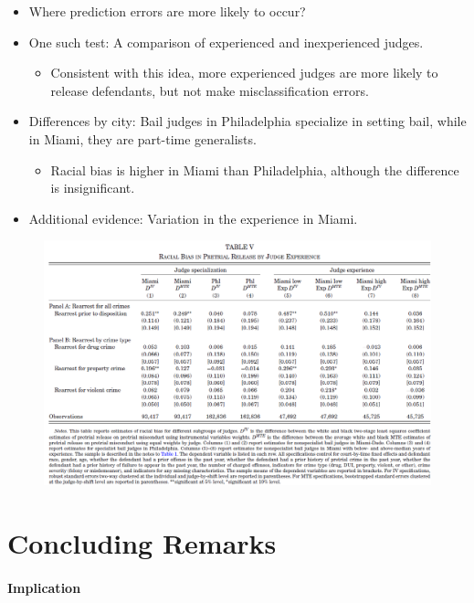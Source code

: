 \documentclass[../root]{subfiles}
\begin{document}
    \begin{itemize}
      \item Where prediction errors are more likely to occur?
      \item One such test: A comparison of experienced and inexperienced judges.
      \begin{itemize}
        \item Consistent with this idea, more experienced judges are more likely to release defendants, but not make misclassification errors.
      \end{itemize}
      \item Differences by city: Bail judges in Philadelphia specialize in setting bail, while in Miami, they are part-time generalists.
      \begin{itemize}
        \item Racial bias is higher in Miami than Philadelphia, although the difference is insignificant.
      \end{itemize}
      \item Additional evidence: Variation in the experience in Miami.
    \end{itemize}

    \begin{figure}[h]
      \centering
      \includegraphics[scale = .7]{os0707tanji/ADY_T5}
    \end{figure}

    \newpage


    \section{Concluding Remarks}

    \paragraph{Implication}
\end{document}
